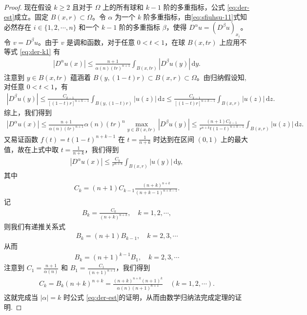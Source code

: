\documentclass[../../main.tex]{subfiles}%
\begin{document}
\begin{proof}
现在假设 $k\geqslant 2$ 且对于 $\Omega$ 上的所有球和 $k-1$ 阶的多重指标，公式 \eqref{eq:der-est}成立。固定 $B(x,r)\subset\Omega$。令 $\alpha$ 为一个 $k$ 阶多重指标，由\eqref{eq:sfiuhsu-11}式知必然存在 $i\in\{1,2,\cdots,n\}$ 和一个 $k-1$ 阶的多重指标 $\beta$，使得 $D^\alpha u=(D^\beta u)_{x_i}$。令 $v=D^\beta u$。由于 $v$ 是调和函数，对于任意 $0<t<1$，在球 $B(x,tr)$ 上应用不等式 \eqref{eq:der-k1} 有
\begin{align*}
|D^\alpha u(x)| \leqslant \frac{n+1}{\alpha(n)(tr)^{n+1}} \int_{B(x,tr)} |D^\beta u(y)|\,\mathrm{d}y.
\end{align*}
注意到 $y\in B(x,tr)$ 蕴涵着 $B(y,(1-t)r)\subset B(x,r)\subset\Omega$。由归纳假设知,对任意 $0<t<1$，有
\begin{align*}
|D^\beta u(y)| \leqslant \frac{C_{k-1}}{[(1-t)r]^{n+k-1}} \int_{B(y,(1-t)r)} |u(z)|\,\mathrm{d}z \leqslant \frac{C_{k-1}}{[(1-t)r]^{n+k-1}} \int_{B(x,r)} |u(z)|\,\mathrm{d}z.
\end{align*}
综上，我们得到
\begin{align*}
|D^\alpha u(x)| \leqslant \frac{n+1}{\alpha(n)(tr)^{n+1}} \alpha(n)(tr)^n \max_{y\in B(x,tr)} |D^\beta u(y)| \leqslant \frac{(n+1)C_{k-1}}{r^{n+k} t(1-t)^{n+k-1}} \int_{B(x,r)} |u(z)|\,\mathrm{d}z.
\end{align*}
又易证函数 $f(t)=t(1-t)^{n+k-1}$ 在 $t=\frac{1}{n+k}$ 时达到在区间 $(0,1)$ 上的最大值，故在上式中取 $t=\frac{1}{n+k}$，我们得到
\begin{align*}
|D^\alpha u(x)| \leqslant \frac{C_k}{r^{n+k}} \int_{B(x,r)} |u(y)|\,\mathrm{d}y,
\end{align*}
其中
\begin{align*}
C_k = (n+1)C_{k-1} \frac{(n+k)^{n+k}}{(n+k-1)^{n+k-1}}.
\end{align*}
记
\begin{align*}
B_k = \frac{C_k}{(n+k)^{n+k}}, \quad k=1,2,\cdots,
\end{align*}
则我们有递推关系式
\begin{align*}
B_k = (n+1)B_{k-1}, \quad k=2,3,\cdots
\end{align*}
从而
\begin{align*}
B_k = (n+1)^{k-1}B_1, \quad k=2,3,\cdots
\end{align*}
注意到 $C_1=\frac{n+1}{\alpha(n)}$ 和 $B_1=\frac{C_1}{(n+1)^{n+1}}$，我们得到
\begin{align*}
C_k = B_k(n+k)^{n+k} = \frac{(n+k)^{n+k}(n+1)^k}{\alpha(n)(n+1)^{n+1}} \quad (k=1,2,\cdots).
\end{align*}
这就完成当 $|\alpha|=k$ 时公式 \eqref{eq:der-est}的证明，从而由数学归纳法完成定理的证明.
\end{proof}
\end{document}
